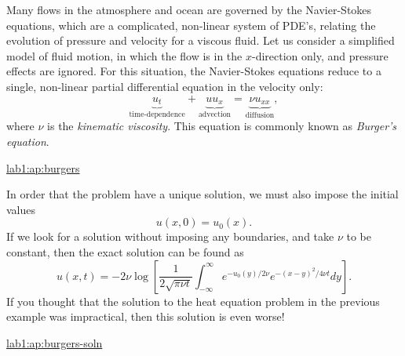 \begin{example}
  Many flows in the atmosphere and ocean are governed by the
  Navier-Stokes equations, which are a complicated, non-linear system
  of PDE's, relating the evolution of pressure and velocity for a
  viscous fluid.
  Let us consider a simplified model of fluid motion, in
  which the flow is in the $x$-direction only, and pressure effects
  are ignored.  For this situation, the Navier-Stokes equations reduce
  to a single, non-linear partial differential equation in the
  velocity only:
  \[
    \underbrace{u_t}_{\mbox{time-dependence}} +
    \underbrace{uu_x}_{\mbox{advection}} 
    = \underbrace{\nu u_{xx}}_{\mbox{diffusion}}, 
  \]
  where $\nu$ is the {\em kinematic viscosity}.
  This equation is commonly known as {\em Burger's equation}. 

  \begin{mathnote}
    \hyperref{Details on the derivation from the Navier-Stokes
      equations \dots}{See Appendix }{ for an 
      an overview of the Navier-Stokes equations and the
      derivation of Burger's equation.}{lab1:ap:burgers} 
  \end{mathnote}

  In order that the problem have a unique solution, we must also
  impose the initial values
  \[
    u(x,0) = u_0(x).
  \]
  If we look for a solution without imposing any boundaries, and take
  $\nu$ to be constant, then the exact solution can be found as 
  \[
    u(x,t) = -2\nu \log \left[ \frac{1}{2 \sqrt{\pi \nu t}}
      \int_{-\infty}^\infty e^{-u_0(y)/2\nu} e^{-(x-y)^2/4\nu t}dy\right]. 
  \]
  If you thought that the solution to the heat equation problem in the
  previous example was impractical, then this solution is even worse!

  \begin{mathnote}
    \hyperref{Details of the derivation \dots}{See Appendix }{ for an  
      a derivation of the solution.}{lab1:ap:burgers-soln} 
  \end{mathnote}
\end{example}

